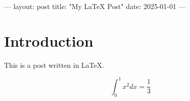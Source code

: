 ---
layout: post
title: "My LaTeX Post"
date: 2025-01-01
---

\section{Introduction}

This is a post written in LaTeX.

$$
\int_0^1 x^2 dx = \frac{1}{3}
$$
